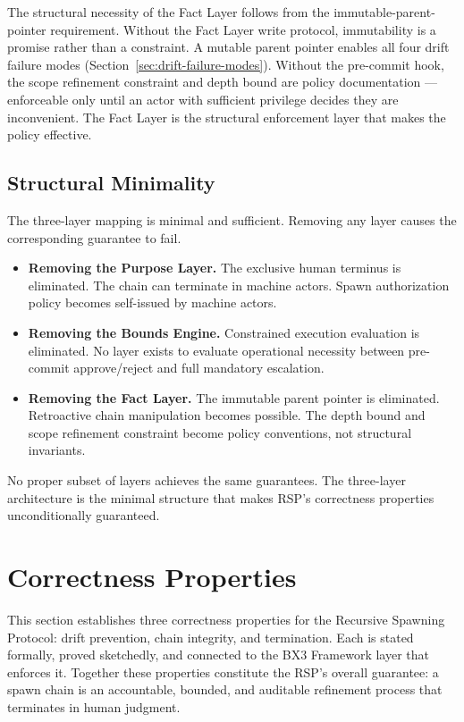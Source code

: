 \medskip
The structural necessity of the Fact Layer follows from the immutable-parent-pointer requirement. Without the Fact Layer write protocol, immutability is a promise rather than a constraint. A mutable parent pointer enables all four drift failure modes (Section~\ref{sec:drift-failure-modes}). Without the pre-commit hook, the scope refinement constraint and depth bound are policy documentation — enforceable only until an actor with sufficient privilege decides they are inconvenient. The Fact Layer is the structural enforcement layer that makes the policy effective.

\subsection{Structural Minimality}
\label{sec:rs-minimality}

The three-layer mapping is minimal and sufficient. Removing any layer causes the corresponding guarantee to fail.

\begin{itemize}
    \item \textbf{Removing the Purpose Layer.} The exclusive human terminus is eliminated. The chain can terminate in machine actors. Spawn authorization policy becomes self-issued by machine actors.
    \item \textbf{Removing the Bounds Engine.} Constrained execution evaluation is eliminated. No layer exists to evaluate operational necessity between pre-commit approve/reject and full mandatory escalation.
    \item \textbf{Removing the Fact Layer.} The immutable parent pointer is eliminated. Retroactive chain manipulation becomes possible. The depth bound and scope refinement constraint become policy conventions, not structural invariants.
\end{itemize}

No proper subset of layers achieves the same guarantees. The three-layer architecture is the minimal structure that makes RSP's correctness properties unconditionally guaranteed.

\section{Correctness Properties}
\label{sec:rs-correctness}

This section establishes three correctness properties for the Recursive Spawning Protocol: drift prevention, chain integrity, and termination. Each is stated formally, proved sketchedly, and connected to the BX3 Framework layer that enforces it. Together these properties constitute the RSP's overall guarantee: a spawn chain is an accountable, bounded, and auditable refinement process that terminates in human judgment.

